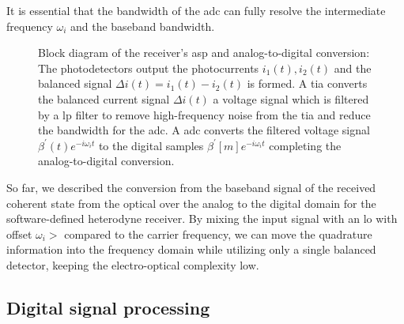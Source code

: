 It is essential that the bandwidth of the \gls{adc} can fully resolve the intermediate frequency $\omega_i$ and the baseband bandwidth.
\begin{figure}[htb]
	\centering
	
	\caption{Block diagram of the receiver's \gls{asp} and analog-to-digital conversion: The photodetectors output the photocurrents $i_1(t),i_2(t)$ and the balanced signal $\Delta i(t)=i_1(t)-i_2(t)$ is formed. A \gls{tia} converts the balanced current signal $\Delta i(t)$ a voltage signal which is filtered by a \gls{lp} filter to remove high-frequency noise from the \gls{tia} and reduce the bandwidth for the \gls{adc}. A \gls{adc} converts the filtered voltage signal $\beta^\prime(t)e^{-i\omega_it}$ to the digital samples $\beta^\prime[m]e^{-i\omega_it}$ completing the analog-to-digital conversion.}
\end{figure}
So far, we described the conversion from the baseband signal of the received coherent state from the optical over the analog to the digital domain for the software-defined heterodyne receiver.
By mixing the input signal with an \gls{lo} with offset $\omega_i>$ compared to the carrier frequency, we can move the quadrature information into the frequency domain while utilizing only a single balanced detector, keeping the electro-optical complexity low.

\FloatBarrier
\subsection{Digital signal processing}

